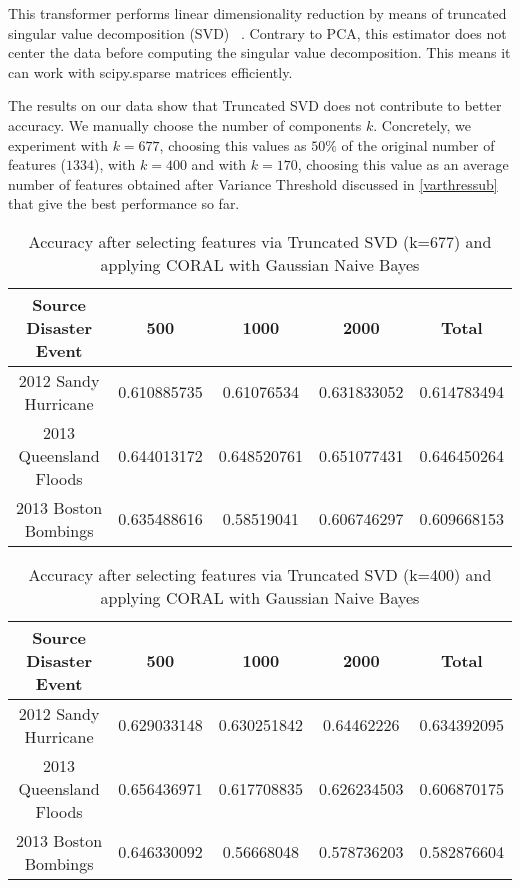 This transformer performs linear dimensionality reduction by means of truncated singular value decomposition (SVD) ~\citep{ir}. Contrary to PCA, this estimator does not center the data before computing the singular value decomposition. This means it can work with scipy.sparse matrices efficiently. 

The results on our data show that Truncated SVD does not contribute to better accuracy. We manually choose the number of components $k$. Concretely, we experiment with $k=677$, choosing this values as $50\%$ of the original number of features ($1334$), with $k=400$ and with $k=170$, choosing this value as an average number of features obtained after Variance Threshold discussed in \ref{varthressub} that give the best performance so far.

\begin{table}[ht]
    \begin{center}
    \caption{Accuracy after selecting features via Truncated SVD (k=677) and applying CORAL with Gaussian Naive Bayes}
    \begin{tabular}[c]{|c|c|c|c|c|}
        \hline
        Source Disaster Event & 500 & 1000 & 2000 & Total \\
        \hline
        2012 Sandy Hurricane & 0.610885735 & 0.61076534 & 0.631833052 & 0.614783494 \\
        2013 Queensland Floods & 0.644013172 & 0.648520761 & 0.651077431 & 0.646450264 \\
        2013 Boston Bombings & 0.635488616 & 0.58519041 & 0.606746297 & 0.609668153 \\
        \hline
    \end{tabular}
    \label{tabletrunsvd677}
   \end{center}
\end{table}

\begin{table}[ht]
    \begin{center}
    \caption{Accuracy after selecting features via Truncated SVD (k=400) and applying CORAL with Gaussian Naive Bayes}
    \begin{tabular}[c]{|c|c|c|c|c|}
        \hline
        Source Disaster Event & 500 & 1000 & 2000 & Total \\
        \hline
        2012 Sandy Hurricane & 0.629033148 & 0.630251842 & 0.64462226 & 0.634392095 \\
        2013 Queensland Floods & 0.656436971 & 0.617708835 & 0.626234503 & 0.606870175 \\
        2013 Boston Bombings & 0.646330092 & 0.56668048 & 0.578736203 & 0.582876604 \\
        \hline
    \end{tabular}
    \label{tabletrunsvd400}
   \end{center}
\end{table}

